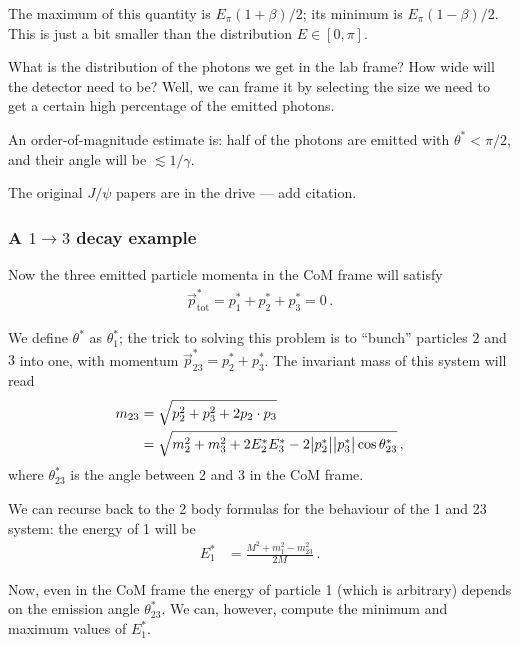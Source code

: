 \documentclass[main.tex]{subfiles}
\begin{document}
The maximum of this quantity is \(E_\pi (1 + \beta ) /2\); its minimum is \(E_\pi (1 - \beta ) / 2\). 
This is just a bit smaller than the distribution \(E \in [0, \pi ]\). 

What is the distribution of the photons we get in the lab frame? How wide will the detector need to be? 
Well, we can frame it by selecting the size we need to get a certain high percentage of the emitted photons. 

An order-of-magnitude estimate is: half of the photons are emitted with \(\theta^{*} < \pi /2\), and their angle will be \(\lesssim 1 / \gamma \).

The original \(J/\psi \) papers are in the drive --- add citation.

\subsubsection{A \(1 \to 3\) decay example}

Now the three emitted particle momenta in the CoM frame will satisfy 
%
\begin{align}
\vec{p}^{*} _{\text{tot}} = 
p^{*}_{1} + 
p^{*}_{2} + 
p^{*}_{3} = 0
\,.
\end{align}

We define \(\theta^{*}\) as \(\theta^{*}_1\); the trick to solving this problem is to ``bunch'' particles \(2\) and \(3\) into one, with momentum \(\vec{p}^{*}_{23} = p^{*}_{2} + p^{*}_{3}\). 
The invariant mass of this system will read 
%
\begin{subequations}
\begin{align}
m_{\text{23}} &= \sqrt{p_2^2 + p_3^2 + 2 p_2 \cdot p_3}  \\
&= \sqrt{m_2^2 + m_3^2 + 2 E_2^{*} E_3^{*} - 2 \abs{p_2^{*}} \abs{p_3^{*}} \cos \theta^{*}_{23}}
\,,
\end{align}
\end{subequations}
%
where \(\theta^{*}_{23}\) is the angle between 2 and 3 in the CoM frame. 

We can recurse back to the 2 body formulas for the behaviour of the 1 and 23 system: the energy of 1 will be 
%
\begin{align}
E_1^{*} &= \frac{M^2 + m_1^2 - m_{23}^2}{2M}
\,.
\end{align}

Now, even in the CoM frame the energy of particle 1 (which is arbitrary) depends on the emission angle \(\theta^{*}_{23}\). 
We can, however, compute the minimum and maximum values of \(E_1^{*}\).
\end{document}
